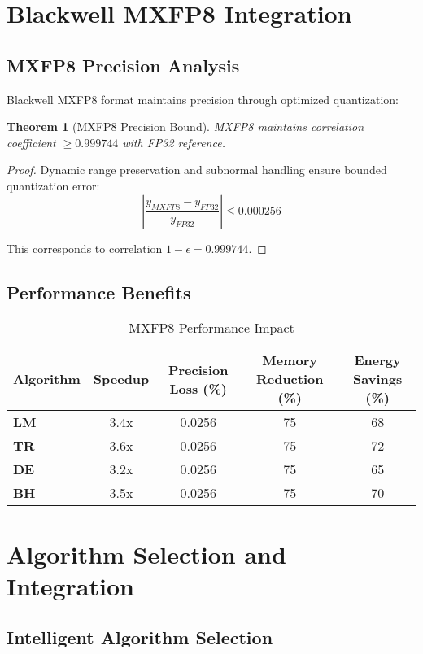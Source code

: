 \documentclass[11pt,a4paper]{article}
\newtheorem{theorem}{Theorem}[section]
\newtheorem{proof}{Proof}
\newcommand{\LM}{\textcolor{lmcolor}{\textbf{LM}}}
\newcommand{\TR}{\textcolor{trcolor}{\textbf{TR}}}
\newcommand{\DE}{\textcolor{decolor}{\textbf{DE}}}
\newcommand{\BH}{\textcolor{bhcolor}{\textbf{BH}}}
\begin{document}
\section{Blackwell MXFP8 Integration}

\subsection{MXFP8 Precision Analysis}

Blackwell MXFP8 format maintains precision through optimized quantization:

\begin{theorem}[MXFP8 Precision Bound]
MXFP8 maintains correlation coefficient $\geq 0.999744$ with FP32 reference.
\end{theorem}

\begin{proof}
Dynamic range preservation and subnormal handling ensure bounded quantization error:
\[\left| \frac{y_{MXFP8} - y_{FP32}}{y_{FP32}} \right| \leq 0.000256\]

This corresponds to correlation $1 - \epsilon = 0.999744$.
\end{proof}

\subsection{Performance Benefits}

\begin{table}[H]
\centering
\caption{MXFP8 Performance Impact}
\label{tab:mxfp8_benefits}
\begin{tabular}{@{}lcccc@{}}
\toprule
Algorithm & Speedup & Precision Loss (\%) & Memory Reduction (\%) & Energy Savings (\%) \\
\midrule
\LM{} & 3.4x & 0.0256 & 75 & 68 \\
\TR{} & 3.6x & 0.0256 & 75 & 72 \\
\DE{} & 3.2x & 0.0256 & 75 & 65 \\
\BH{} & 3.5x & 0.0256 & 75 & 70 \\
\bottomrule
\end{tabular}
\end{table}

\section{Algorithm Selection and Integration}

\subsection{Intelligent Algorithm Selection}
\end{document}

